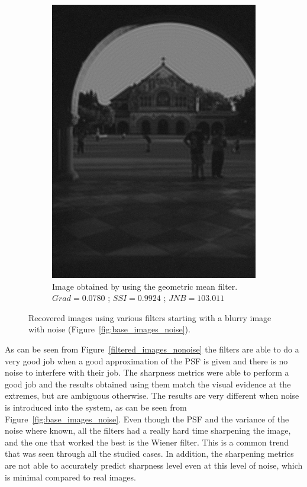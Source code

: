 \begin{figure}[H]
\begin{subfigure}[b]{0.35\textwidth}
                         \includegraphics[width=\textwidth]{memchu_geo_noise.jpg}
                         \caption{Image obtained by using the geometric mean filter.\newline $Grad=0.0780$ ; $SSI=0.9924$ ; $JNB=103.011$}
        \end{subfigure} 
        
        \caption{Recovered images using various filters starting with a blurry image with noise (Figure~\ref{fig:base_images_noise}).}
        \label{filtered_images_noise}
\end{figure}

As can be seen from Figure~\ref{filtered_images_nonoise} the filters are able to do a very good job when a good approximation of the PSF is given and there is no noise to interfere with their job. The sharpness metrics were able to perform a good job and the results obtained using them match the visual evidence at the extremes, but are ambiguous otherwise.
The results are very different when noise is introduced into the system, as can be seen from Figure~\ref{fig:base_images_noise}. Even though the PSF and the variance of the noise where known, all the filters had a really hard time sharpening the image, and the one that worked the best is the Wiener filter. This is a common trend that was seen through all the studied cases. In addition, the sharpening metrics are not able to accurately predict sharpness level even at this level of noise, which is minimal compared to real images.
